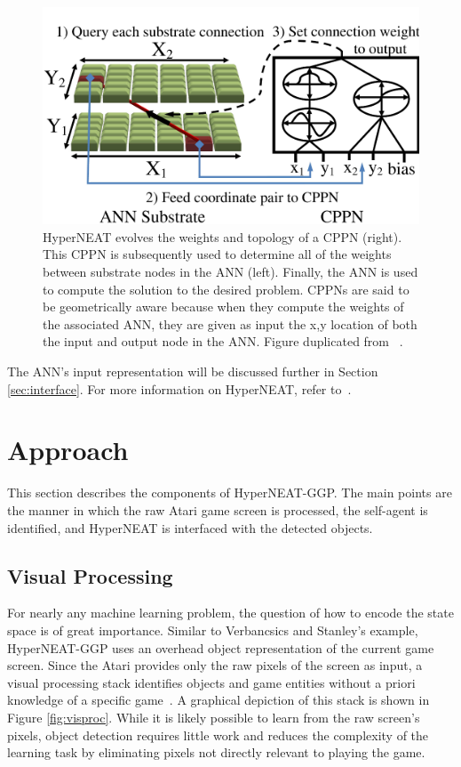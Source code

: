 \documentclass{sig-alternate}
\begin{document}
\begin{figure}[htp]
\begin{center}
\includegraphics[width=\columnwidth]{figures/cppn}
\end{center}
\caption{HyperNEAT evolves the weights and topology of a CPPN (right). This CPPN is subsequently used to determine all of the weights between substrate nodes in the ANN (left). Finally, the ANN is used to compute the solution to the desired problem. CPPNs are said to be geometrically aware because when they compute the weights of the associated ANN, they are given as input the x,y location of both the input and output node in the ANN. Figure duplicated from ~\cite{verbancsics10}.}
\label{fig:cppn}
\end{figure}

The ANN's input representation will be discussed further in Section \ref{sec:interface}. For more information on HyperNEAT, refer to~\cite{gauci08}.

\section{Approach}
\label{sec:approach}
This section describes the components of HyperNEAT-GGP. The main points are the manner in which the raw Atari game screen is processed, the self-agent is identified, and HyperNEAT is interfaced with the detected objects. 

\subsection{Visual Processing}
For nearly any machine learning problem, the question of how to encode the state space is of great importance. Similar to Verbancsics and Stanley's example, HyperNEAT-GGP uses an overhead object representation of the current game screen. Since the Atari provides only the raw pixels of the screen as input, a visual processing stack identifies objects and game entities without a priori knowledge of a specific game~\cite{naddaf10}. A graphical depiction of this stack is shown in Figure \ref{fig:visproc}. While it is likely possible to learn from the raw screen's pixels, object detection requires little work and reduces the complexity of the learning task by eliminating pixels not directly relevant to playing the game.
\end{document}

